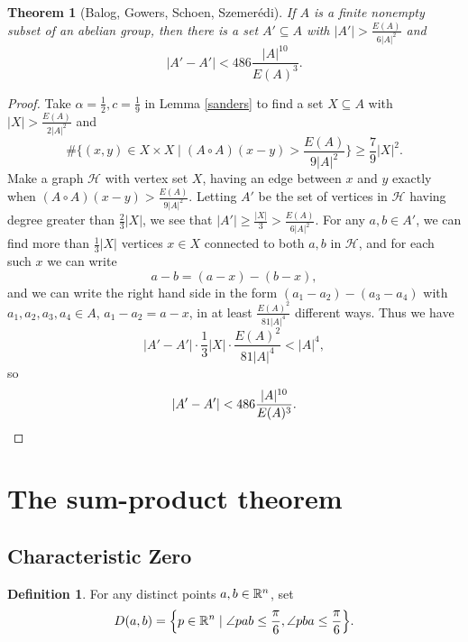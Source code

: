 \documentclass[letterpaper,11pt]{article}
\newtheorem{thm}{Theorem}
\theoremstyle{definition}
\newtheorem{defn}{Definition}
\theoremstyle{remark}
\begin{document}
\begin{thm}[Balog, Gowers, Schoen, Szemer\'edi] If $A$ is a finite nonempty subset of an abelian group, then there is a set $A' \subseteq A$ with $|A'| > \frac{E(A)}{6|A|^2}$ and
\[
|A'-A'| < 486\frac{|A|^{10}}{E(A)^3}.
\]
\end{thm}
\begin{proof} Take $\alpha = \frac{1}{2}, c = \frac{1}{9}$ in Lemma \ref{sanders} to find a set $X\subseteq A$ with $|X| > \frac{E(A)}{2|A|^2}$ and
\[
\#\bigg\{(x,y)\in X\times X \mid (A\circ A)(x-y) > \frac{E(A)}{9|A|^2}\bigg\} \ge \frac{7}{9}|X|^2.
\]
Make a graph $\mathcal{H}$ with vertex set $X$, having an edge between $x$ and $y$ exactly when $(A\circ A)(x-y) > \frac{E(A)}{9|A|^2}$. Letting $A'$ be the set of vertices in $\mathcal{H}$ having degree greater than $\frac{2}{3}|X|$, we see that $|A'| \ge \frac{|X|}{3} > \frac{E(A)}{6|A|^2}$. For any $a,b \in A'$, we can find more than $\frac{1}{3}|X|$ vertices $x \in X$ connected to both $a,b$ in $\mathcal{H}$, and for each such $x$ we can write
\[
a-b = (a-x) - (b-x),
\]
and we can write the right hand side in the form $(a_1-a_2) - (a_3-a_4)$ with $a_1, a_2, a_3, a_4 \in A$, $a_1-a_2 = a-x$, in at least $\frac{E(A)^2}{81|A|^4}$ different ways. Thus we have
\[
|A'-A'|\cdot \frac{1}{3}|X|\cdot \frac{E(A)^2}{81|A|^4} < |A|^4,
\]
so
\[
|A'-A'| < 486\frac{|A|^{10}}{E(A)^3}.\qedhere
\]
\end{proof}


\section{The sum-product theorem}

\subsection{Characteristic Zero}

\begin{defn} For any distinct points $a,b\in \mathbb{R}^n$, set
\[
D(a,b) = \Big\{p \in \mathbb{R}^n \mid \angle pab \le \frac{\pi}{6}, \angle pba \le \frac{\pi}{6}\Big\}.
\]
\end{defn}
\end{document}
